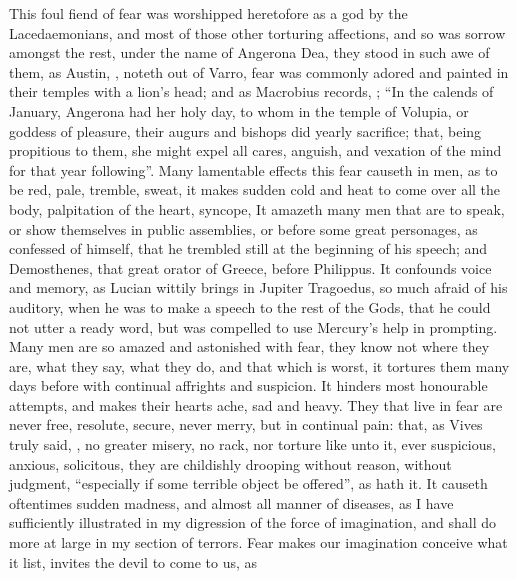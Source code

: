 This foul fiend of fear was worshipped heretofore as a god by the
Lacedaemonians, and most of those other torturing
affections, and so was sorrow amongst the rest, under the
name of Angerona Dea, they stood in such awe of them, as Austin,
, noteth out of Varro,
fear was commonly adored and painted in their temples with
a lion's head; and as Macrobius records, ; \enquote{In the calends of January, Angerona had
her holy day, to whom in the temple of Volupia, or goddess of pleasure, their
augurs and bishops did yearly sacrifice; that, being propitious to them, she
might expel all cares, anguish, and vexation of the mind for that year
following}. Many lamentable effects this fear causeth in men, as to be red,
pale, tremble, sweat, it makes sudden cold and heat to
come over all the body, palpitation of the heart, syncope, \etc{} It amazeth
many men that are to speak, or show themselves in public assemblies, or before
some great personages, as \Tully{} confessed of himself, that he trembled still at
the beginning of his speech; and Demosthenes, that great orator of Greece,
before Philippus. It confounds voice and memory, as Lucian wittily brings in
Jupiter Tragoedus, so much afraid of his auditory, when he was to make a speech
to the rest of the Gods, that he could not utter a ready word, but was
compelled to use Mercury's help in prompting. Many men are so amazed and
astonished with fear, they know not where they are, what they say,
what they do, and that which is worst, it tortures them
many days before with continual affrights and suspicion. It hinders most
honourable attempts, and makes their hearts ache, sad and heavy. They that live
in fear are never free, resolute, secure, never merry, but
in continual pain: that, as Vives truly said, , no greater misery, no rack, nor torture like unto it, ever suspicious,
anxious, solicitous, they are childishly drooping without reason, without
judgment, \enquote{especially if some terrible object be offered},
as \Plutarch{} hath it. It causeth oftentimes sudden madness, and almost all
manner of diseases, as I have sufficiently illustrated in my
digression of the force of imagination, and shall do more
at large in my section of terrors. Fear makes our
imagination conceive what it list, invites the devil to come to us, as
